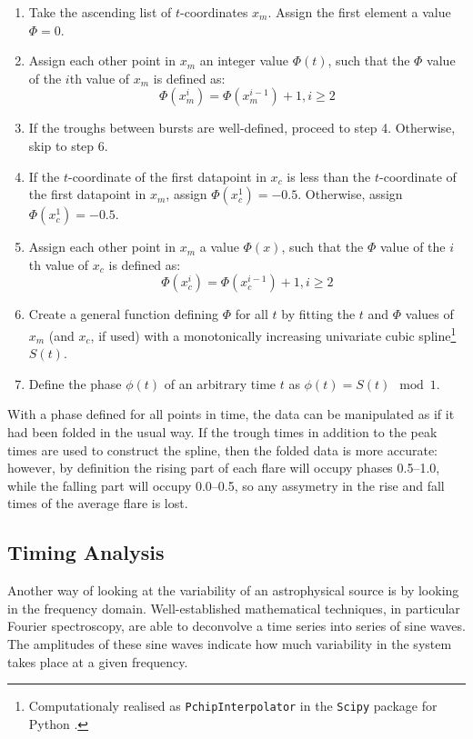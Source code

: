 \begin{enumerate}
  \item Take the ascending list of $t$-coordinates $x_m$.  Assign the first element a value $\Phi=0$.
  \item Assign each other point in $x_m$ an integer value $\Phi(t)$, such that the $\Phi$ value of the $i$th value of $x_m$ is defined as:
  \begin{equation}
  \Phi(x_m^{i})=\Phi(x_m^{i-1})+1, i\geq2
  \end{equation}
  \item If the troughs between bursts are well-defined, proceed to step 4.  Otherwise, skip to step 6.
  \item If the $t$-coordinate of the first datapoint in $x_c$ is less than the $t$-coordinate of the first datapoint in $x_m$, assign $\Phi(x_c^1)=-0.5$.  Otherwise, assign $\Phi(x_c^1)=-0.5$.
  \item Assign each other point in $x_m$ a value $\Phi(x)$, such that the $\Phi$ value of the $i$th value of $x_c$ is defined as:
  \begin{equation}
  \Phi(x_c^{i})=\Phi(x_c^{i-1})+1, i\geq2
  \end{equation}
  \item Create a general function defining $\Phi$ for all $t$ by fitting the $t$ and $\Phi$ values of $x_m$ (and $x_c$, if used) with a monotonically increasing univariate cubic spline\footnote{Computationaly realised as \texttt{PchipInterpolator} in the \texttt{Scipy} package for Python \citep{NumPy}.} $S(t)$.
  \item Define the phase $\phi(t)$ of an arbitrary time $t$ as $\phi(t)=S(t)\mod1$.
\end{enumerate}

\par With a phase defined for all points in time, the data can be manipulated as if it had been folded in the usual way.  If the trough times in addition to the peak times are used to construct the spline, then the folded data is more accurate: however, by definition the rising part of each flare will occupy phases 0.5--1.0, while the falling part will occupy 0.0--0.5, so any assymetry in the rise and fall times of the average flare is lost.

\subsection{Timing Analysis}

\par Another way of looking at the variability of an astrophysical source is by looking in the frequency domain.  Well-established mathematical techniques, in particular Fourier spectroscopy, are able to deconvolve a time series into series of sine waves.  The amplitudes of these sine waves indicate how much variability in the system takes place at a given frequency.

